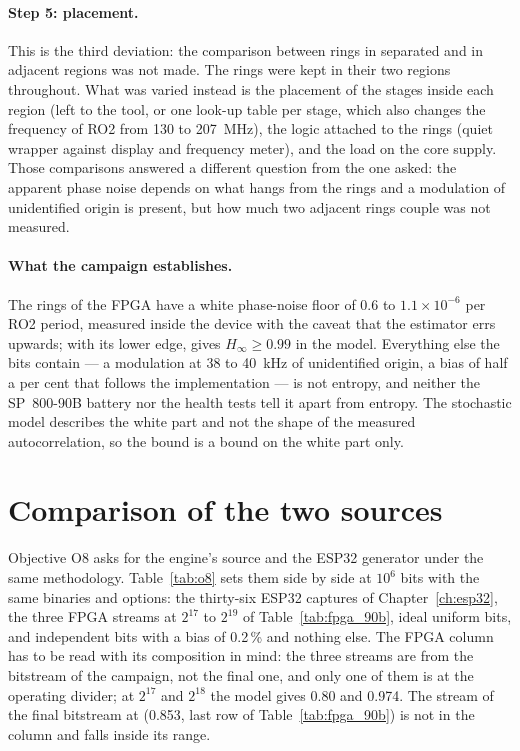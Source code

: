 \paragraph{Step 5: placement.} This is the third deviation: the
comparison between rings in separated and in adjacent regions was not
made. The rings were kept in their two regions throughout. What was
varied instead is the placement of the stages inside each region (left
to the tool, or one look-up table per stage, which also changes the
frequency of RO2 from 130 to 207~MHz), the logic attached to the rings
(quiet wrapper against display and frequency meter), and the load on the
core supply. Those comparisons answered a different question from the
one asked: the apparent phase noise depends on what hangs from the rings
and a modulation of unidentified origin is present, but how much two
adjacent rings couple was not measured.

\paragraph{What the campaign establishes.} The rings of the \ac{FPGA}
have a white phase-noise floor of 0.6 to $1.1\times10^{-6}$ per RO2
period, measured inside the device with the caveat that the estimator
errs upwards; with its lower edge,  gives $H_\infty \ge 0.99$ in
the model. Everything else the bits contain --- a modulation at 38 to
40~kHz of unidentified origin, a bias of half a per cent that follows
the implementation --- is not entropy, and neither the SP~800-90B battery
nor the health tests tell it apart from entropy. The stochastic model
describes the white part and not the shape of the measured
autocorrelation, so the bound is a bound on the white part only.

\section{Comparison of the two sources}
\label{sec:o8}

Objective O8 asks for the engine's source and the ESP32 generator under
the same methodology. Table~\ref{tab:o8} sets them side by side at
$10^6$ bits with the same binaries and options: the thirty-six ESP32
captures of Chapter~\ref{ch:esp32}, the three \ac{FPGA} streams at
$2^{17}$ to $2^{19}$ of Table~\ref{tab:fpga_90b}, ideal uniform bits, and
independent bits with a bias of 0.2\,\% and nothing else. The \ac{FPGA}
column has to be read with its composition in mind: the three streams are
from the bitstream of the campaign, not the final one, and only one of
them is at the operating divider; at $2^{17}$ and $2^{18}$ the model
gives 0.80 and 0.974. The stream of the final bitstream at 
(0.853, last row of Table~\ref{tab:fpga_90b}) is not in the column and
falls inside its range.

